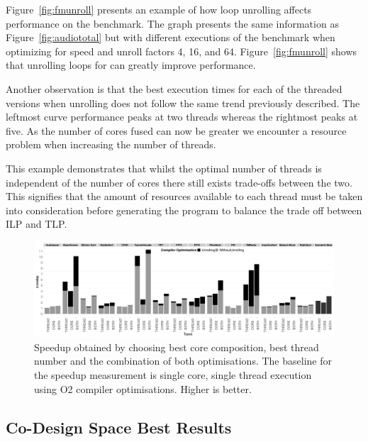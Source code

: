 Figure~\ref{fig:fmunroll} presents an example of how loop unrolling affects performance on the  benchmark.
The graph presents the same information as Figure~\ref{fig:audiototal} but with different executions of the benchmark when optimizing for speed and unroll factors 4, 16, and 64.
Figure~\ref{fig:fmunroll} shows that unrolling loops for  can greatly improve performance.

Another observation is that the best execution times for each of the threaded versions when unrolling does not follow the same trend previously described.
The leftmost curve performance peaks at two threads whereas the rightmost peaks at five.
As the number of cores fused can now be greater we encounter a resource problem when increasing the number of threads.

This example demonstrates that whilst the optimal number of threads is independent of the number of cores there still exists trade-offs between the two.
This signifies that the amount of resources available to each thread must be taken into consideration before generating the program to balance the trade off between ILP and TLP.

\begin{figure}[ht]
 \centering
  \centering
    \includegraphics[width=1\textwidth]{streamit-paper/graphics/threadcompbench.pdf}
    \caption{Speedup obtained by choosing best core composition, best
      thread number and the combination of both optimisations. The baseline for the speedup measurement is single core, single thread execution using O2 compiler optimisations. Higher
      is better.}\label{fig:overviewhist}
\end{figure}

\subsection{Co-Design Space Best Results}

